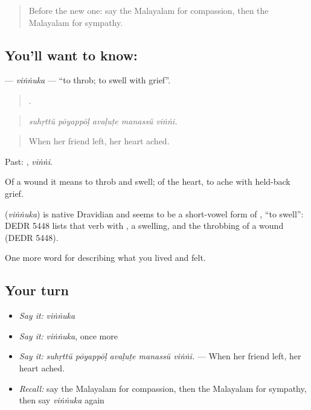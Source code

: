 \label{lesson:ML-C520-vinnuka}



\begin{quote}
Before the new one: say the Malayalam for compassion, then the Malayalam for sympathy.
\end{quote}

\subsection*{You'll want to know: }
\textbf{} — \emph{viṅṅuka} — \textquotedblleft{}to throb; to swell with grief\textquotedblright{}.

\begin{quote}
    .
\end{quote}

\begin{quote}
\emph{suhṛttŭ pōyappōḷ avaḷuṭe manassŭ viṅṅi.}
\end{quote}

\begin{quote}
When her friend left, her heart ached.
\end{quote}

Past: , \emph{viṅṅi}.

Of a wound it means to throb and swell; of the heart, to ache with held-back grief.

\begin{cousinweb}
\textbf{} (\emph{viṅṅuka}) is native Dravidian and seems to be a short-vowel form of , \textquotedblleft{}to swell\textquotedblright{}: DEDR 5448 lists that verb with , a swelling, and the throbbing of a wound (DEDR 5448).
\end{cousinweb}

\begin{grammarlens}[title={What you've built}]
One more word for describing what you lived and felt.
\end{grammarlens}

\subsection*{Your turn}
\begin{itemize}
\raggedright
  \item \emph{Say it:} \emph{viṅṅuka}
  \item \emph{Say it:} \emph{viṅṅuka}, once more
  \item \emph{Say it:} \emph{suhṛttŭ pōyappōḷ avaḷuṭe manassŭ viṅṅi.} — When her friend left, her heart ached.
  \item \emph{Recall:} say the Malayalam for compassion, then the Malayalam for sympathy, then say \emph{viṅṅuka} again
\end{itemize}

